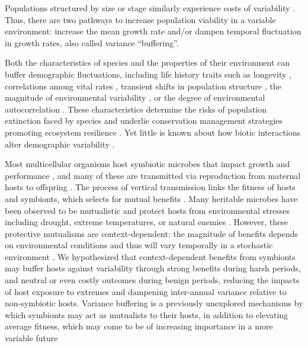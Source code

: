 \documentclass[12pt]{article}
\begin{document}
\noindent Populations structured by size or stage similarly experience costs of variability \cite{cohen1979comparative,tuljapurkar2013population}.
Thus, there are two pathways to increase population viability in a variable environment: increase the mean growth rate and/or dampen temporal fluctuation in growth rates, also called variance ``buffering''.

Both the characteristics of species and the properties of their environment can buffer demographic fluctuations, including life history traits such as longevity \cite{pfister1998patterns, morris2008longevity}, correlations among vital rates \cite{compagnoni2016effect}, transient shifts in population structure \cite{ellis2013role}, the magnitude of environmental variability \cite{rodriguez2021limits}, or the degree of environmental autocorrelation \cite{tuljapurkar1980population,fieberg2001stochastic}. 
These characteristics determine the risks of population extinction faced by species \cite{menges2000applications} and underlie conservation management strategies promoting ecosystem resilience \cite{kuparinen2016fishing}. 
Yet little is known about how biotic interactions alter demographic variability \cite{hilde_demographic_2020}. 

Most multicellular organisms host symbiotic microbes that impact growth and performance \cite{rodriguez2009fungal,mcfall2013animals}, and many of these are transmitted via reproduction from maternal hosts to offspring \cite{funkhouser2013mom}.
The process of vertical transmission links the fitness of hosts and symbionts, which selects for mutual benefits \cite{ewald1987transmission,fine1975vectors}.
Many heritable microbes have been observed to be mutualistic and protect hosts from environmental stresses including drought, extreme temperatures, or natural enemies \cite{russell2006costs,brownlie2009symbiont,kivlin2013fungal,corbin2017heritable,hoadley2019host}. 
However, these protective mutualisms are context-dependent: the magnitude of benefits depends on environmental conditions \cite{chamberlain2014context} and thus will vary temporally in a stochastic environment \cite{jordano1994spatial,billick2003relative}.
We hypothesized that context-dependent benefits from symbionts may buffer hosts against variability through strong benefits during harsh periods, and neutral or even costly outcomes during benign periods, reducing the impacts of host exposure to extremes and dampening inter-annual variance relative to non-symbiotic hosts.
Variance buffering is a previously unexplored mechanisms by which symbionts may act as mutualists to their hosts, in addition to elevating average fitness, which may come to be of increasing importance in a more variable future \cite{rudgers2020climate}
\end{document}
